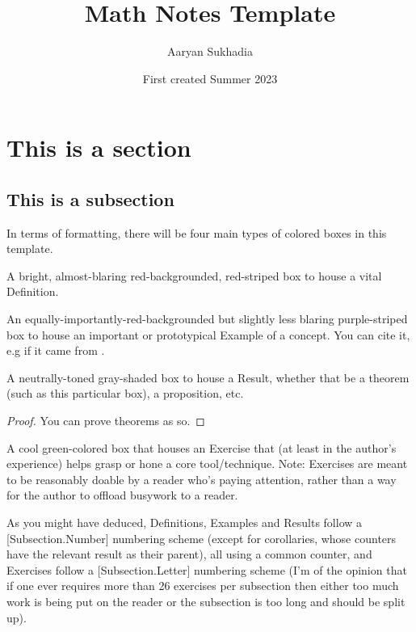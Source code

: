 \documentclass[12pt,x11names]{article}
\newcounter{exercises}
\begin{document}
\title{Math Notes Template}

\author{Aaryan Sukhadia}
\date{First created Summer 2023}
\onehalfspacing

\maketitle
\tableofcontents

\section{This is a section}

\subsection{This is a subsection}

In terms of formatting, there will be four main types of colored boxes in this template.
\begin{defn} 
    A bright, almost-blaring red-backgrounded, red-striped box to house a vital Definition.
\end{defn}
\begin{example}
    An equally-importantly-red-backgrounded but slightly less blaring purple-striped box to house an important or prototypical Example of a concept. You can cite it, e.g if it came from \cite{tate1997fourier}.
\end{example}
\begin{theorem}
    A neutrally-toned gray-shaded box to house a Result, whether that be a theorem (such as this particular box), a proposition, etc.
\end{theorem}
\begin{proof}
    You can prove theorems as so.
\end{proof}
\begin{exercise}
    A cool green-colored box that houses an Exercise that (at least in the author's experience) helps grasp or hone a core tool/technique. Note: Exercises are meant to be reasonably doable by a reader who's paying attention, rather than a way for the author to offload busywork to a reader.
\end{exercise}

\begin{observation}
As you might have deduced, Definitions, Examples and Results follow a [Subsection.Number] numbering scheme (except for corollaries, whose counters have the relevant result as their parent), all using a common counter, and Exercises follow a [Subsection.Letter] numbering scheme (I'm of the opinion that if one ever requires more than 26 exercises per subsection then either too much work is being put on the reader or the subsection is too long and should be split up).
\end{observation}
\end{document}
